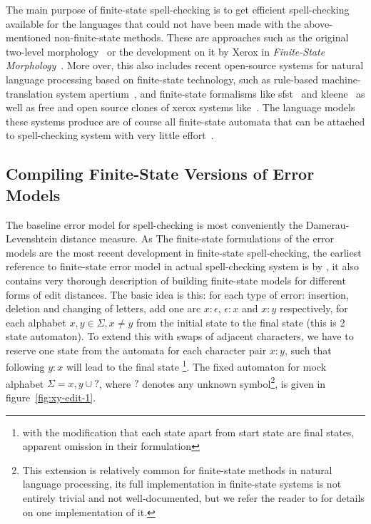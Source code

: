 \documentclass[a4paper,12pt]{article}
\begin{document}
The main purpose of finite-state spell-checking is to get efficient
spell-checking available for the languages that could not have been made with
the above-mentioned non-finite-state methods. These are approaches such as the
original two-level morphology~\cite[]{koskenniemi/1983} or the development on
it by Xerox in \emph{Finite-State Morphology}~\cite[]{beesley2003finite}.  More
over, this also includes recent open-source systems for natural language
processing based on finite-state technology, such as rule-based
machine-translation system apertium~\cite[]{apertium2010}, and finite-state
formalisms like sfst~\cite[]{schmid2006programming} and
kleene~\cite[]{beesley2012kleene} as well as free and open source clones of
xerox systems like~\cite{hfst,foma}.  The language models these systems produce
are of course all finite-state automata that can be attached to spell-checking
system with very little effort~\cite[e.g.][]{pirinen2012compiling}.

\subsection{Compiling Finite-State Versions of Error Models}
\label{subsec:error-models}

The baseline error model for spell-checking is most conveniently the
Damerau-Levenshtein distance measure. As The finite-state formulations of the
error models are the most recent development in finite-state spell-checking,
the earliest reference to finite-state error model in actual spell-checking
system is by \cite{schulz/2002}, it also contains very thorough description of
building finite-state models for different forms of edit distances. The basic
idea is this: for each type of error: insertion, deletion and changing of
letters, add one arc $x:\epsilon$, $\epsilon:x$ and $x:y$ respectively, for
each alphabet $x, y \in \Sigma, x \neq y$ from the initial state to the final
state (this is 2 state automaton). To extend this with swaps of adjacent
characters, we have to reserve one state from the automata for each character
pair $x:y$, such that following $y:x$ will lead to the final state
\cite[]{pirinen/2010/lrec}\footnote{with the modification that each state apart
from start state are final states, apparent omission in their formulation}.
The fixed automaton for mock alphabet $\Sigma = {x, y} \cup {?}$, where $?$
denotes any unknown symbol\footnote{This extension is relatively common for
    finite-state methods in natural language processing, its full
    implementation in finite-state systems is not entirely trivial and not
    well-documented, but we refer the reader to \cite[]{beesley2003finite} for
    details on one implementation of it.}, is given in
    figure~\ref{fig:xy-edit-1}.
\end{document}
